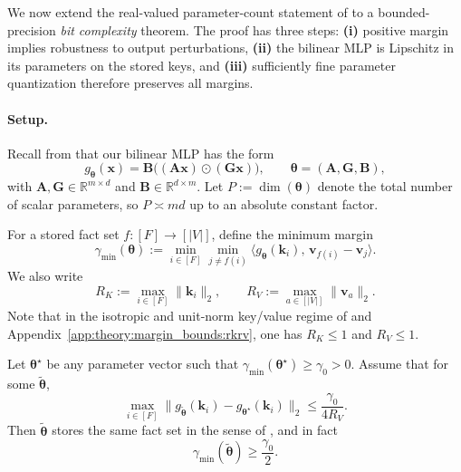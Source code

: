 We now extend the real-valued parameter-count statement of  to a bounded-precision \emph{bit complexity} theorem.
The proof has three steps:
\textbf{(i)} positive margin implies robustness to output perturbations,
\textbf{(ii)} the bilinear MLP is Lipschitz in its parameters on the stored keys,
and \textbf{(iii)} sufficiently fine parameter quantization therefore preserves all margins.

\paragraph{Setup.}
Recall from  that our bilinear MLP has the form
\begin{equation}
g_{\boldsymbol{\theta}}(\mathbf{x})=\mathbf{B}\bigl((\mathbf{A}\mathbf{x})\odot(\mathbf{G}\mathbf{x})\bigr),
\qquad
\boldsymbol{\theta}=(\mathbf{A},\mathbf{G},\mathbf{B}),
\label{eq:bilinear_mlp_bits}
\end{equation}
with $\mathbf{A},\mathbf{G}\in\mathbb{R}^{m\times d}$ and $\mathbf{B}\in\mathbb{R}^{d\times m}$.
Let $P:=\dim(\boldsymbol{\theta})$ denote the total number of scalar parameters, so
$P\asymp md$ up to an absolute constant factor.

For a stored fact set $f:[F]\to[|V|]$, define the minimum margin
\[
\gamma_{\min}(\boldsymbol{\theta})
:=
\min_{i\in[F]}
\min_{j\neq f(i)}
\bigl\langle
g_{\boldsymbol{\theta}}(\mathbf{k}_{i}),\, \mathbf{v}_{f(i)}-\mathbf{v}_{j}
\bigr\rangle.
\]
We also write
\[
R_{K}:=\max_{i\in[F]}\|\mathbf{k}_{i}\|_{2},
\qquad
R_{V}:=\max_{a\in[|V|]}\|\mathbf{v}_{a}\|_{2}.
\]
Note that in the isotropic and unit-norm key/value regime of  and Appendix~\ref{app:theory:margin_bounds:rkrv}, one has $R_{K}\le 1$ and $R_{V}\le 1$.

\begin{lemma}
\label{lem:margin_robustness_bits}
Let $\boldsymbol{\theta}^\star$ be any parameter vector such that
$\gamma_{\min}(\boldsymbol{\theta}^\star)\ge \gamma_{0}>0$.
Assume that for some $\widetilde{\boldsymbol{\theta}}$,
\[
\max_{i\in[F]}
\bigl\|
g_{\widetilde{\boldsymbol{\theta}}}(\mathbf{k}_{i})-g_{\boldsymbol{\theta}^\star}(\mathbf{k}_{i})
\bigr\|_{2}
\le
\frac{\gamma_0}{4R_V}.
\]
Then $\widetilde{\boldsymbol{\theta}}$ stores the same fact set in the sense of
, and in fact
\[
\gamma_{\min}(\widetilde{\boldsymbol{\theta}})\ge \frac{\gamma_0}{2}.
\]
\end{lemma}

